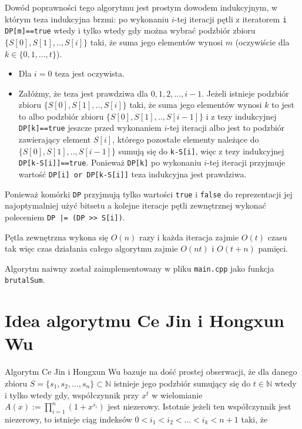 \documentclass{article}
\begin{document}
Dowód poprawności tego algorytmu jest prostym dowodem indukcyjnym, w którym teza indukcyjna
brzmi: po wykonaniu $i$-tej iteracji pętli z iteratorem \texttt{i}
\texttt{DP[m]==true}
wtedy i tylko wtedy
gdy można wybrać podzbiór zbioru
$\{S\left[0\right],S\left[1\right],..,S\left[i\right]\}$
taki, że suma jego elementów wynosi 
$m$ (oczywiście dla $k \in \{0,1,...,t\}$). 
\begin{itemize}
    \item Dla $i = 0$ teza jest oczywista.
    \item Załóżmy, że teza jest prawdziwa dla $0,1,2,...,i-1$. Jeżeli istnieje podzbiór
    zbioru $\{S \left[ 0 \right],S\left[ 1 \right],..,S\left[ i \right]\}$ taki, że suma jego elementów wynosi $k$ to jest to 
    albo podzbiór zbioru $\{{S\left[0\right],S\left[1\right],..,S\left[i-1\right]\}}$ i z tezy indukcyjnej \texttt{DP[k]==true}
    jeszcze przed wykonaniem $i$-tej iteracji albo jest to podzbiór zawierający element
    $S\left[i \right]$, którego pozostałe elementy należące do 
    $\{S \left[ 0 \right] ,S \left[ 1 \right],..,S \left[ i-1 \right] \}$ sumują się 
    do \texttt{k-S[i]}, więc z tezy indukcyjnej \texttt{DP[k-S[i]]==true}. Ponieważ \texttt{DP[k]} po wykonaniu $i$-tej iteracji
    przyjmuje wartość \texttt{DP[i] or DP[k-S[i]]} teza indukcyjna jest prawdziwa.

\end{itemize}
Ponieważ komórki \texttt{DP} przyjmują tylko wartości \texttt{true} i \texttt{false} do reprezentacji jej najoptymalniej
użyć bitsetu a kolejne iteracje pętli zewnętrznej wykonać poleceniem \texttt{DP |= (DP >> S[i])}.

Pętla zewnętrzna wykona się $O(n)$ razy i każda iteracja zajmie $O(t)$ czasu tak więc
czas działania całego algorytmu zajmie $O(nt)$ i $O(t+n)$ pamięci.

Algorytm naiwny został zaimplementowany w pliku \texttt{main.cpp} jako funkcja \texttt{brutalSum}.

\section{Idea algorytmu Ce Jin i Hongxun Wu}


Algorytm Ce Jin i Hongxun Wu bazuje na dość prostej obserwacji, że dla danego zbioru
$S=\{s_1,s_2,...,s_n\} \subset \mathbb{N}$ istnieje jego podzbiór sumujący się do $t \in \mathbb{N}$ wtedy 
i tylko wtedy gdy, współczynnik przy $x^t$ w  wielomianie $A(x) :=\prod_{i = 1}^{n}(1+x^{s_i})$ jest 
niezerowy. Istotnie jeżeli ten współczynnik jest niezerowy, to istnieje ciąg indeksów $0<i_1<i_2<...<i_k<n+1$ taki, że 
\end{document}
